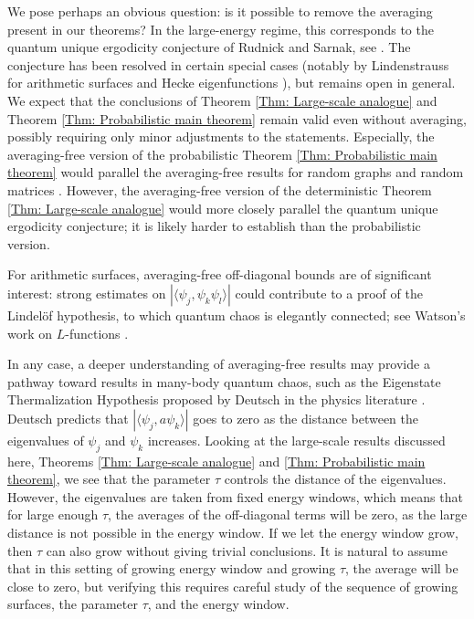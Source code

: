 \documentclass[11pt,twoside,reqno]{amsart} \usepackage{a4wide} \usepackage[T1]{fontenc} \usepackage[utf8]{inputenc} \usepackage{soul}  \usepackage{amsmath} \usepackage{amsfonts} \usepackage{amssymb} \usepackage{mathtools} \usepackage{amsthm} \usepackage{xcolor} \usepackage{graphicx} \usepackage{hyperref} \usepackage{standalone} \usepackage{esint} \usepackage{comment} \usepackage[left=2.3cm,top=3cm,right=2.3cm]{geometry} \usepackage{bm} \usepackage{svg} \usepackage{float} \numberwithin{equation}{section} \theoremstyle{plain} \newtheorem{thm}{Theorem}[section] \newtheorem{theorem}[thm]{Theorem} \newtheorem*{theorem*}{Theorem}\newtheorem{conj}[thm]{Conjecture} \newtheorem{lemma}[thm]{Lemma} \newtheorem{prop}[thm]{Proposition} \newtheorem{proposition}[thm]{Proposition} \newtheorem{cor}[thm]{Corollary} \newtheorem{question}[thm]{Question} \newtheorem{corollary}[thm]{Corollary} \newtheorem{assumption}[thm]{Assumption} \theoremstyle{definition} \newtheorem{defn}[thm]{Definition} \newtheorem{choice}[thm]{Choice} \newtheorem{definition}[thm]{Definition} \newtheorem{ex}[thm]{Example} \newtheorem{notation}[thm]{Notation} \newtheorem*{ack}{Acknowledgements} \theoremstyle{remark} \newtheorem{remark}[thm]{Remark} \newtheorem{bigremark}[thm]{Remark} \usepackage{xcolor} \newcommand{\red}[1]{ {\color{Red}#1} } \newcommand{\blue}[1]{ {\color{Blue}#1} } \author{Kai Hippi} \address{Aalto University, Espoo, Finland} \email{kai.hippi@aalto.fi}
\begin{document}
We pose perhaps an obvious question: is it possible to remove the averaging present in our theorems? In the large-energy regime, this corresponds to the quantum unique ergodicity conjecture of Rudnick and Sarnak, see \cite{RS94}. The conjecture has been resolved in certain special cases (notably by Lindenstrauss for arithmetic surfaces and Hecke eigenfunctions \cite{Lin06}), but remains open in general. We expect that the conclusions of Theorem \ref{Thm: Large-scale analogue} and Theorem \ref{Thm: Probabilistic main theorem} remain valid even without averaging, possibly requiring only minor adjustments to the statements. Especially, the averaging-free version of the probabilistic Theorem \ref{Thm: Probabilistic main theorem} would parallel the averaging-free results for random graphs \cite{BHKY17, BKY17, BHY19} and random matrices \cite{CES21}. However, the averaging-free version of the deterministic Theorem \ref{Thm: Large-scale analogue} would more closely parallel the quantum unique ergodicity conjecture; it is likely harder to establish than the probabilistic version.

For arithmetic surfaces, averaging-free off-diagonal bounds are of significant interest: strong estimates on 
\( |\langle \psi_{j}, \psi_{k} \psi_{l} \rangle| \) could contribute to a proof of the Lindelöf hypothesis, to which quantum chaos is elegantly connected; see Watson's work on \( L \)-functions \cite{Wat02}.

In any case, a deeper understanding of averaging-free results may provide a pathway toward results in many-body quantum chaos, such as the Eigenstate Thermalization Hypothesis proposed by Deutsch in the physics literature \cite{Deu18}. Deutsch predicts that $ |\langle \psi_{j}, a \psi_{k} \rangle| $ goes to zero as the distance between the eigenvalues of $ \psi_{j} $ and $ \psi_{k} $ increases. Looking at the large-scale results discussed here, Theorems \ref{Thm: Large-scale analogue} and \ref{Thm: Probabilistic main theorem}, we see that the parameter $ \tau $ controls the distance of the eigenvalues. However, the eigenvalues are taken from fixed energy windows, which means that for large enough $ \tau $, the averages of the off-diagonal terms will be zero, as the large distance is not possible in the energy window. If we let the energy window grow, then $ \tau $ can also grow without giving trivial conclusions. It is natural to assume that in this setting of growing energy window and growing $ \tau $, the average will be close to zero, but verifying this requires careful study of the sequence of growing surfaces, the parameter $ \tau $, and the energy window.
\end{document}
